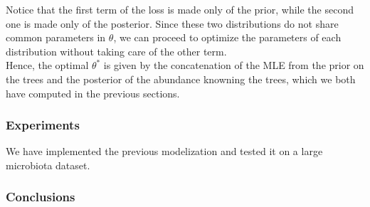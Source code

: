 Notice that the first term of the loss is made only of the prior, while the second one is made only of the posterior.
Since these two distributions do not share common parameters in $\theta$, we can proceed to optimize the parameters of each distribution
without taking care of the other term. \\

Hence, the optimal $\theta^*$ is given by the concatenation of the MLE from the prior on the trees and the posterior of the abundance knowning the trees,
which we both have computed in the previous sections.


\subsubsection{Experiments}

We have implemented the previous modelization and tested it on a large microbiota dataset.

\subsubsection{Conclusions}

